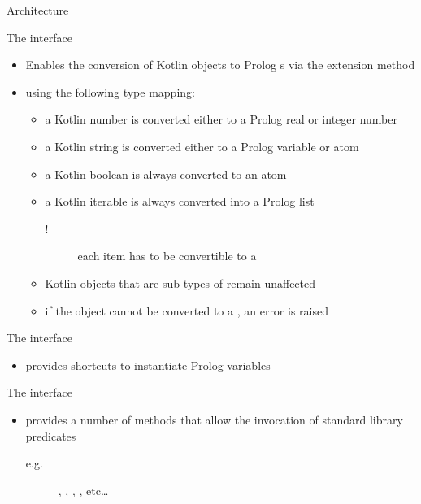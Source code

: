 \documentclass[handout]{beamer}
\begin{document}
\begin{frame}[allowframebreaks]{Architecture}
    \begin{block}{The  interface}
        \begin{itemize}
            \item Enables the conversion of Kotlin objects to Prolog s via the  extension method
            \item using the following type mapping:
            \begin{itemize}
                \item a Kotlin number is converted either to a Prolog real or integer number
                \item a Kotlin string is converted either to a Prolog variable or atom
                \item a Kotlin boolean is always converted to an atom
                \item a Kotlin iterable is always converted into a Prolog list
                \begin{description}
                    \item [!] each item has to be convertible to a  
                \end{description}
                \item Kotlin objects that are sub-types of  remain unaffected
                \item if the object cannot be converted to a , an error is raised
            \end{itemize}
        \end{itemize}
    \end{block}

    \framebreak

    \begin{block}{The  interface}
        \begin{itemize}
            \item provides  shortcuts to instantiate Prolog variables
        \end{itemize}
    \end{block}
    \begin{block}{The  interface}
        \begin{itemize}
            \item provides a number of methods that allow the invocation of standard library predicates
            \begin{description}
                \item [e.g.] , , , , etc\ldots 
            \end{description}
        \end{itemize}
    \end{block}


\end{frame}
\end{document}
